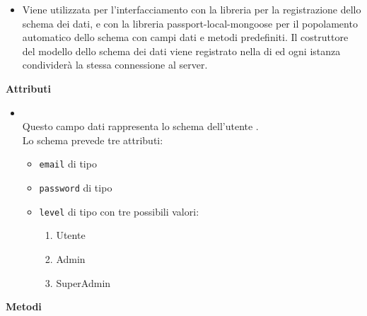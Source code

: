 \begin{itemize}
\item[] Viene utilizzata per l'interfacciamento con la libreria  per la registrazione dello schema dei dati, e con la libreria passport-local-mongoose per il popolamento automatico dello schema con campi dati e metodi predefiniti.
Il costruttore del modello dello schema dei dati viene registrato nella  di  ed ogni istanza condividerà la stessa connessione al server.
\end{itemize}
\textbf{Attributi}
\begin{itemize}
\item[] \textbf{} \\ Questo campo dati rappresenta lo schema  dell'utente . \\
Lo schema prevede tre attributi:
\begin{itemize}
\item[]  \texttt{email} di tipo 
\item[]  \texttt{password} di tipo 
\item[]  \texttt{level} di tipo  con tre possibili valori: 
\begin{enumerate}
\item Utente
\item Admin
\item SuperAdmin
\end{enumerate}
\end{itemize}

\end{itemize}
\textbf{Metodi}

